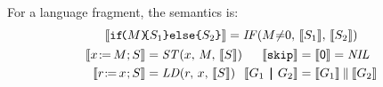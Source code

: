 \begin{definition}
  \noindent
  For a language fragment, the semantics is:
  \begin{gather*}
    \sem{\IF{\aExp}\THEN\aCmd_1\ELSE\aCmd_2\FI} = \sIF{\aExp{\neq}0}\sTHEN\sem{\aCmd_1}\sELSE\sem{\aCmd_2}\sFI
    \\
    \begin{aligned}
      \sem{\PW{\aLoc}{\aExp}\SEMI \aCmd} &=
      \sSTOREPRE{\aLoc}{\aExp}{\sem{\aCmd}}
      &
      \sem{\SKIP} &= \sem{\NIL} = \sNIL 
      \\
      \sem{\PR{\aLoc}{\aReg}\SEMI \aCmd} &=
      \sLOADPRE{\aReg}{\aLoc}{\sem{\aCmd}}
      &
      \makebox[3.5em][r]{$\sem{\aGrp_1 \PAR \aGrp_2}$} &= \sem{\aGrp_1}\sPAR\sem{\aGrp_2}
    \end{aligned}
  \end{gather*}
\end{definition}

